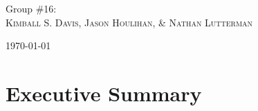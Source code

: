 \documentclass[11pt]{article}
\begin{document}
\begin{titlepage}
	
	\Large{Group \#16:}\\
		 \Large\textsc{Kimball S. Davis, Jason Houlihan, \& Nathan Lutterman} %
	
	
	\vfill\vfill\vfill\vfill %
	
	{\large\today} %
	
	
	 
	
	\vfill %
	
\end{titlepage}

\setlength{\columnsep}{.2 in}

\setlength{\parskip}{0pt}

	
\section*{Executive Summary}
\end{document}
